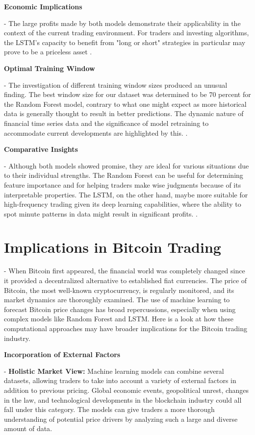 \textbf{Economic Implications}

-	The large profits made by both models demonstrate their applicability in the context of the current trading environment. For traders and investing algorithms, the LSTM's capacity to benefit from "long or short" strategies in particular may prove to be a priceless asset \citep{krauss2017deep}.

\textbf{Optimal Training Window}

-	The investigation of different training window sizes produced an unusual finding. The best window size for our dataset was determined to be 70 percent for the Random Forest model, contrary to what one might expect as more historical data is generally thought to result in better predictions. The dynamic nature of financial time series data and the significance of model retraining to accommodate current developments are highlighted by this. \citep{baumeister2015sign}.

\textbf{Comparative Insights}

-	Although both models showed promise, they are ideal for various situations due to their individual strengths. The Random Forest can be useful for determining feature importance and for helping traders make wise judgments because of its interpretable properties. The LSTM, on the other hand, maybe more suitable for high-frequency trading given its deep learning capabilities, where the ability to spot minute patterns in data might result in significant profits. \citep{sirignano2019universal}.

\section{Implications in Bitcoin Trading}

-  When Bitcoin first appeared, the financial world was completely changed since it provided a decentralized alternative to established fiat currencies. The price of Bitcoin, the most well-known cryptocurrency, is regularly monitored, and its market dynamics are thoroughly examined. The use of machine learning to forecast Bitcoin price changes has broad repercussions, especially when using complex models like Random Forest and LSTM. Here is a look at how these computational approaches may have broader implications for the Bitcoin trading industry.

\textbf{Incorporation of External Factors }

-	\textbf{Holistic Market View:} Machine learning models can combine several datasets, allowing traders to take into account a variety of external factors in addition to previous pricing. Global economic events, geopolitical unrest, changes in the law, and technological developments in the blockchain industry could all fall under this category. The models can give traders a more thorough understanding of potential price drivers by analyzing such a large and diverse amount of data\citep{GANDAL201886}.

